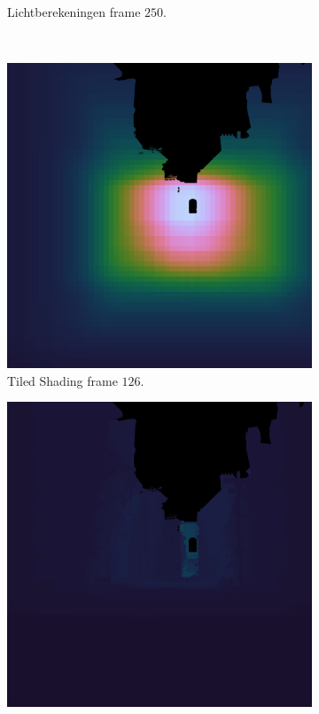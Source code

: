 \begin{figure}[t]
\begin{subfigure}[b]{0.35\textwidth}
    \caption{Lichtberekeningen frame $250$.}
    \vspace{2pt}
    \label{fig:cs-test-frames-example:sa:250cs}
  \end{subfigure}\\
  \begin{subfigure}[b]{0.35\textwidth}
    \includegraphics[width=\textwidth]{./img/raw/lc-frame-example/ts/pa_frame_126.png}
    \caption{Tiled Shading frame $126$.}
    \vspace{2pt}
    \label{fig:cs-test-frames-example:pa:126ts}
  \end{subfigure}\quad %
  \begin{subfigure}[b]{0.35\textwidth}
    \includegraphics[width=\textwidth]{./img/raw/lc-frame-example/cs/pa_frame_126.png}

\end{subfigure}
\end{figure}
